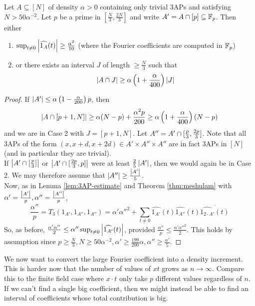 \documentclass{article}
\begin{document}
\begin{lem}
  Let $A \subseteq [N]$ of density $\alpha > 0$ containing only trivial 3APs and satisfying $N > 50\alpha^{-2}$. Let $p$ be a prime in $[\frac N3, \frac{2N}3]$ and write $A' = A \cap [p] \subseteq \mathbb F_p$. Then either
  \begin{enumerate}
    \item $\sup_{t \ne 0} \left\lvert \widehat{1_A}(t)\right\rvert \ge \frac{\alpha^2}{10}$ (where the Fourier coefficients are computed in $\mathbb F_p$)
    \item or there exists an interval $J$ of length $\ge \frac N3$ such that
    $$\left\lvert A \cap J\right\rvert \ge \alpha\left(1 + \frac\alpha{400}\right)\left\lvert J\right\rvert$$
  \end{enumerate}
\end{lem}
\begin{proof}
  If $\left\lvert A'\right\rvert \le \alpha\left(1 - \frac\alpha{200}\right)p$, then
  $$\left\lvert A \cap [p + 1, N]\right\rvert \ge \alpha(N - p) + \frac{\alpha^2p}{200} \ge \alpha\left(1 + \frac\alpha{400}\right)(N - p)$$
  and we are in Case 2 with $J = [p + 1, N]$. Let $A'' = A' \cap [\frac p3, \frac{2p}3]$. Note that all 3APs of the form $(x, x + d, x + 2d) \in A' \times A'' \times A''$ are in fact 3APs in $[N]$ (and in particular they are trivial). \\
  If $\left\lvert A' \cap [\frac p3]\right\rvert$ or $\left\lvert A' \cap [\frac{2p}3, p]\right\rvert$ were at least $\frac 25\left\lvert A'\right\rvert$, then we would again be in Case 2. We may therefore assume that $\left\lvert A''\right\rvert \ge \frac{\left\lvert A'\right\rvert}5$. \\
  Now, as in Lemma \ref{lem:3AP-estimate} and Theorem \ref{thm:meshulam} with $\alpha' = \frac{\left\lvert A'\right\rvert}p, \alpha'' = \frac{\left\lvert A''\right\rvert}p$,
  $$\frac{\alpha''}p = T_3(1_{A'}, 1_{A''}, 1_{A''}) = \alpha'\alpha''^2 + \sum_{t \ne 0}\widehat{1_{A'}}(t)\widehat{1_{A''}}(t)\overline{\widehat{1_{2 \cdot A'}}(t)}$$
  So, as before, $\frac{\alpha'\alpha''}2 \le \alpha''\sup_{t \ne 0} \left\lvert \widehat{1_{A'}}(t)\right\rvert$, provided $\frac{\alpha''}p \le \frac{\alpha'\alpha''^2}2$. This holds by assumption since $p \ge \frac N3, N \ge 50\alpha^{-2}, \alpha' \ge \frac{199}{200}\alpha, \alpha'' \ge \frac{\alpha'}5$.
\end{proof}

\newlec

We now want to convert the large Fourier coefficient into a density increment. This is harder now that the number of values of $xt$ grows as $n \to \infty$. Compare this to the finite field case where $x \cdot t$ only take $p$ different values regardless of $n$. If we can't find a single big coefficient, then we might instead be able to find an interval of coefficients whose total contribution is big.
\end{document}
